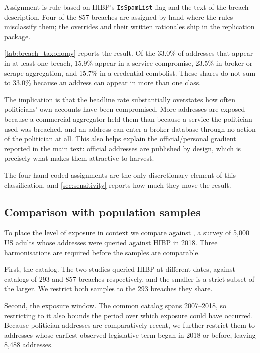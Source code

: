 \documentclass[12pt, letterpaper]{article}
\begin{document}
Assignment is rule-based on HIBP's \texttt{IsSpamList} flag and the text of the breach description. Four of the 857 breaches are assigned by hand where the rules misclassify them; the overrides and their written rationales ship in the replication package.

\cref{tab:breach_taxonomy} reports the result. Of the 33.0\% of addresses that appear in at least one breach, 15.9\% appear in a service compromise, 23.5\% in broker or scrape aggregation, and 15.7\% in a credential combolist. These shares do not sum to 33.0\% because an address can appear in more than one class.

The implication is that the headline rate substantially overstates how often politicians' own accounts have been compromised. More addresses are exposed because a commercial aggregator held them than because a service the politician used was breached, and an address can enter a broker database through no action of the politician at all. This also helps explain the official/personal gradient reported in the main text: official addresses are published by design, which is precisely what makes them attractive to harvest.



The four hand-coded assignments are the only discretionary element of this classification, and \cref{sec:sensitivity} reports how much they move the result.

\subsection*{Comparison with population samples}

To place the level of exposure in context we compare against \citet{sood2019pwned}, a survey of 5,000 US adults whose addresses were queried against HIBP in 2018. Three harmonisations are required before the samples are comparable.

First, the catalog. The two studies queried HIBP at different dates, against catalogs of 293 and 857 breaches respectively, and the smaller is a strict subset of the larger. We restrict both samples to the 293 breaches they share.

Second, the exposure window. The common catalog spans 2007--2018, so restricting to it also bounds the period over which exposure could have occurred. Because politician addresses are comparatively recent, we further restrict them to addresses whose earliest observed legislative term began in 2018 or before, leaving 8,488 addresses.
\end{document}
